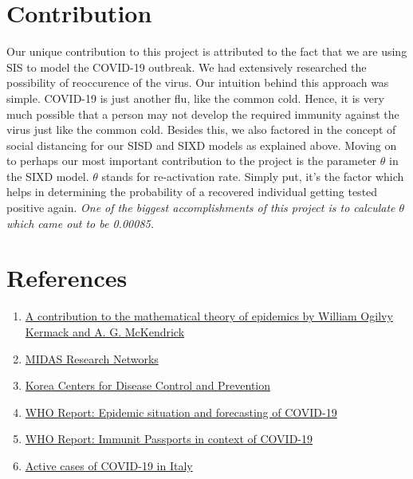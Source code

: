 \documentclass{article}
\begin{document}
	\section{Contribution}
	Our unique contribution to this project is attributed to the fact that we are using SIS to model the COVID-19 outbreak. We had extensively researched the possibility of reoccurence of the virus. Our intuition behind this approach was simple. COVID-19 is just another flu, like the common cold. Hence, it is very much possible that a person may not develop the required immunity against the virus just like the common cold. Besides this, we also factored in the concept of social distancing for our SISD and SIXD models as explained above. 
	Moving on to perhaps our most important contribution to the project is the parameter $\theta$ in the SIXD model. $\theta$ stands for re-activation rate. Simply put, it's the factor which helps in determining the probability of a recovered individual getting tested positive again. \textit{One of the biggest accomplishments of this project is to calculate $\theta$ which came out to be 0.00085.}

	\section{References}
	\begin{enumerate}
		\item \href{https://royalsocietypublishing.org/doi/10.1098/rspa.1927.0118}{A contribution to the mathematical theory of epidemics by William Ogilvy Kermack and A. G. McKendrick}
		\item \href{https://github.com/midas-network/COVID-19}{MIDAS Research Networks}
		\item \href{https://www.cdc.go.kr/cdc_eng/}{Korea Centers for Disease Control and Prevention}
		\item \href{https://www.who.int/bulletin/online_first/20-255158.pdf}{WHO Report: Epidemic situation and forecasting of COVID-19}
		\item \href{https://www.who.int/news-room/commentaries/detail/immunity-passports-in-the-context-of-covid-19}{WHO Report: Immunit Passports in context of COVID-19}
		\item \href{https://www.worldometers.info/coronavirus/country/italy/}{Active cases of COVID-19 in Italy}{}
	\end{enumerate}
\end{document}
